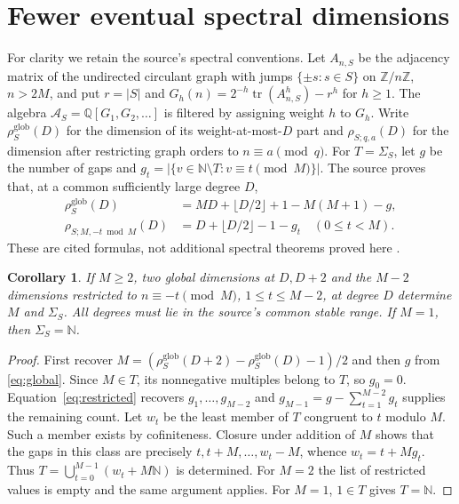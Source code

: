 \documentclass[11pt]{article}
\newtheorem{corollary}[theorem]{Corollary}
\newcommand{\N}{\mathbb N}
\begin{document}
\section{Fewer eventual spectral dimensions}
For clarity we retain the source's spectral conventions.
Let $A_{n,S}$ be the adjacency matrix of the undirected circulant graph
with jumps $\{\pm s:s\in S\}$ on $\mathbb Z/n\mathbb Z$, $n>2M$,
and put $r=|S|$ and
$G_h(n)=2^{-h}\operatorname{tr}(A_{n,S}^h)-r^h$ for $h\ge1$.
The algebra $\mathcal A_S=\mathbb Q[G_1,G_2,\ldots]$ is filtered by assigning
weight $h$ to $G_h$. Write $\rho^{\mathrm{glob}}_S(D)$ for the dimension
of its weight-at-most-$D$ part and $\rho_{S;q,a}(D)$ for the dimension
after restricting graph orders to $n\equiv a\pmod q$.
For $T=\Sigma_S$, let $g$ be the number of gaps and
$g_t=|\{v\in\N\setminus T:v\equiv t\pmod M\}|$.
The source proves that, at a common sufficiently large degree $D$,
\begin{align}
 \rho^{\mathrm{glob}}_S(D)&=MD+\lfloor D/2\rfloor+1-M(M+1)-g,
       \label{eq:global}\\
 \rho_{S;M,-t\bmod M}(D)&=D+\lfloor D/2\rfloor-1-g_t
       \quad(0\le t<M).
       \label{eq:restricted}
\end{align}
These are cited formulas, not additional spectral theorems proved here
\cite[Theorems 1.1--1.3, Corollaries 3.9--3.10]{VC}.

\begin{corollary}\label{cor:spectral}
If $M\ge2$, two global dimensions at $D,D+2$ and the $M-2$ dimensions
restricted to $n\equiv-t\pmod M$, $1\le t\le M-2$, at degree $D$
determine $M$ and $\Sigma_S$. All degrees must lie in the source's
common stable range.
If $M=1$, then $\Sigma_S=\N$.
\end{corollary}
\begin{proof}
First recover $M=(\rho^{\mathrm{glob}}_S(D+2)-\rho^{\mathrm{glob}}_S(D)-1)/2$
and then $g$ from \eqref{eq:global}.
Since $M\in T$, its nonnegative multiples belong to $T$, so $g_0=0$.
Equation~\eqref{eq:restricted} recovers $g_1,\ldots,g_{M-2}$ and
$g_{M-1}=g-\sum_{t=1}^{M-2}g_t$ supplies the remaining count.
Let $w_t$ be the least member of $T$ congruent to $t$ modulo $M$.
Such a member exists by cofiniteness. Closure under addition of $M$
shows that the gaps in this class are precisely
$t,t+M,\ldots,w_t-M$, whence $w_t=t+Mg_t$.
Thus $T=\bigcup_{t=0}^{M-1}(w_t+M\N)$ is determined.
For $M=2$ the list of restricted values is empty and the same argument
applies. For $M=1$, $1\in T$ gives $T=\N$.
\end{proof}
\end{document}
